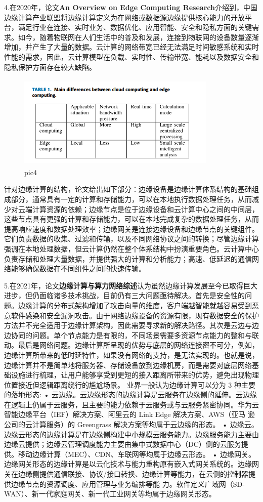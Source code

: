 \documentclass[a4paper,twoside]{scrbook}
\begin{document}
4.在2020年，论文\textbf{An Overview on Edge Computing Research}介绍到，中国边缘计算产业联盟将边缘计算定义为在网络或数据源边缘提供核心能力的开放平台，满足行业在连接、实时业务、数据优化、应用智能、安全和隐私方面的关键需求。如今，随着物联网在人们生活中的普及和发展，连接到物联网的设备数量逐渐增加，并产生了大量的数据。云计算的网络带宽已经无法满足时间敏感系统和实时性能的需求，因此，云计算模型在负载、实时性、传输带宽、能耗以及数据安全和隐私保护方面存在较大缺陷。
\begin{figure}
\centering %
\includegraphics[height=4.5cm,width=9.5cm]{edge1.png}
\caption{pic4}
\end{figure}
针对边缘计算的结构，论文给出如下部分：边缘设备是边缘计算体系结构的基础组成部分，通常具有一定的计算和存储能力，可以在本地执行数据处理任务，从而减少对云端计算资源的依赖；边缘节点是位于边缘设备和云计算中心之间的中间层，这些节点具有更强的计算和存储能力，可以在本地完成复杂的数据处理任务，从而提高响应速度和数据处理效率；边缘网关是连接边缘设备和边缘节点的关键组件。它们负责数据的收集、过滤和传输，以及不同网络协议之间的转换；尽管边缘计算强调在本地处理数据，但云计算仍然在整个体系结构中扮演重要角色。云计算中心负责存储和处理大量数据，并提供强大的计算和分析能力；高速、低延迟的通信网络能够确保数据在不同组件之间的快速传输。

5.在2021年，论文\textbf{边缘计算与算力网络综述}认为虽然边缘计算发展至今已取得巨大进步，但仍面临诸多技术挑战，目前仍有三大问题亟待解决。首先是安全性的问题。边缘计算的分布式架构增加了攻击向量的维度，客户端越智能就越容易受到恶意软件感染和安全漏洞攻击。由于网络边缘设备的资源有限，现有数据安全的保护方法并不完全适用于边缘计算架构，因此需要寻求新的解决路径。其次是云边与边边协同的问题。单个节点能力是有限的，不同场景需要多资源节点能力的整和与联动。最后是网络问题。边缘计算所呈现的优势与底层的网络连接密不可分，例如，边缘计算所带来的低时延特性，如果没有网络的支持，是无法实现的。也就是说，边缘计算并不是简单地将服务器、存储设备放到边缘机房，而是需要对底层网络基础设施进行梳理，让用户能够享受到更短的接入距离所带来的优势，避免出现物理位置接近但逻辑距离绕行的尴尬场景。
业界一般认为边缘计算可以分为 3 种主要的落地形态:
• 云边缘。云边缘形态的边缘计算是云服务在边缘侧的延伸。云边缘在逻辑上仍属于云服务，且主要的能力依赖于云服务或与云服务紧密协同。华为云智能边缘平台（IEF）解决方案、阿里云的 Link Edge 解决方案、AWS（亚马
逊公司的云计算服务）的 Greengrass 解决方案等均属于云边缘的形态。
• 边缘云。边缘云形态的边缘计算是在边缘侧构建中小规模云服务能力。边缘服务能力主要由边缘云提供；边缘云管理调度能力主要由集中式数据中心（DC）侧的云服务提供。移动边缘计算（MEC）、CDN、车联网等均属于边缘云形态。
• 边缘网关。边缘网关形态的边缘计算是以云化技术与能力重构原有嵌入式网关系统的。边缘网关在边缘侧提供通信联接、协议/接口转换、边缘计算等能力，在云侧的控制器提供边缘节点的资源调度、应用管理与业务编排等能 力。软件定义广域网（SD-WAN）、新一代家庭网关、新一代工业网关等均属于边缘网关形态。
\end{document}
